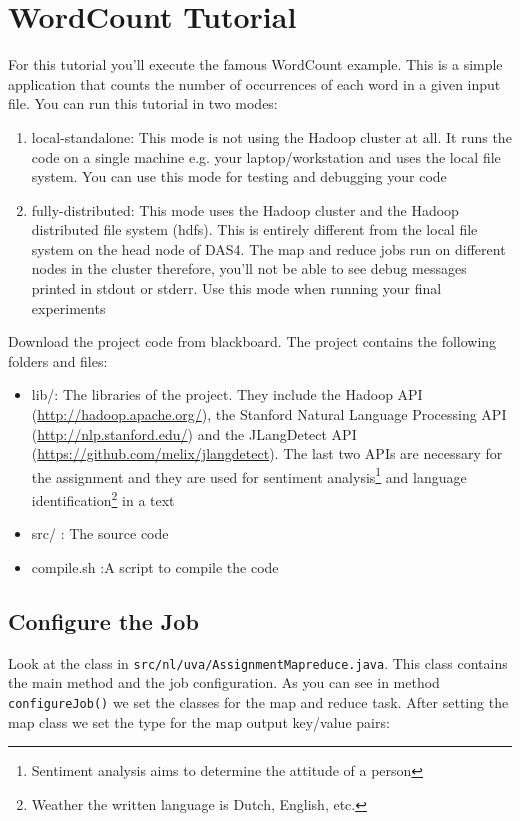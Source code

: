 \documentclass[a4paper,10pt]{article}
\begin{document}
  
  \section{WordCount Tutorial}
  
  For this tutorial you'll execute the famous WordCount example. This is a simple application that counts the number of occurrences of each word in a given input file. You can run this tutorial in two modes: 
  \begin{enumerate}
    \item local-standalone: This mode is not using the Hadoop cluster at all. It runs the code on a single machine e.g. your laptop/workstation and uses the local file system. You can use this mode for testing and debugging your code
    \item fully-distributed: This mode uses the Hadoop cluster and the Hadoop distributed file system (hdfs). This is entirely different from the local file system on the head node of DAS4. The map and reduce jobs run on different nodes in the cluster  therefore, you'll not be able to see debug messages printed in stdout or stderr. Use this mode when running your final experiments
  \end{enumerate}
  
  Download the project code from blackboard. The project contains the following folders and files: 
  
  \begin{itemize}
    \item lib/: The libraries of the project. They include the Hadoop API (\url{http://hadoop.apache.org/}), the Stanford Natural Language Processing API (\url{http://nlp.stanford.edu/}) and the JLangDetect API (\url{https://github.com/melix/jlangdetect}). The last two APIs are necessary for the assignment and they are used for sentiment analysis\footnote{Sentiment analysis aims to determine the attitude of a person} and language identification\footnote{Weather the written language is Dutch, English, etc. } in a text
    \item src/ : The source code
    \item compile.sh :A script to compile the code
  \end{itemize}
  
  
  \subsection{Configure the Job}
  
  Look at the class in \texttt{src/nl/uva/AssignmentMapreduce.java}. This class contains the main method and the job configuration. 
  As you can see in method \texttt{configureJob()} we set the classes for the map and reduce task. After setting the map class we set the type for the map output key/value pairs:
  
\end{document}
